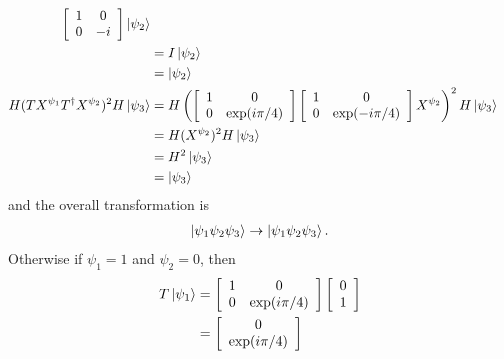 \documentclass[a4paper,12pt]{article}
\begin{document}
\begin{enumerate}
\begin{align*}
            \left[ \begin{array}{cc}
                1 & 0 \\
                0 & -i
            \end{array} \right] \ket{\psi_2} \\
            &= I \ket{\psi_2} \\
            &= \ket{\psi_2} \\
            H (T X^{\psi_1} T^\dagger X^{\psi_2})^2 H \ket{\psi_3} &= H \left(
            \left[ \begin{array}{cc}
                1 & 0 \\
                0 & \mbox{exp}(i \pi / 4)
            \end{array} \right]
            \left[ \begin{array}{cc}
                1 & 0 \\
                0 & \mbox{exp}(-i \pi / 4)
            \end{array} \right]
            X^{\psi_2} \right)^2 H \ket{\psi_3} \\
            &= H (X^{\psi_2})^2 H \ket{\psi_3} \\
            &= H^2 \ket{\psi_3} \\
            &= \ket{\psi_3} \\
        \end{align*}
        and the overall transformation is
        \begin{align*}
            \ket{\psi_1 \psi_2 \psi_3} \rightarrow \ket{\psi_1 \psi_2 \psi_3}.
        \end{align*}
        Otherwise if $\psi_1 = 1$ and $\psi_2 = 0$, then
        \begin{align*}
            T \ket{\psi_1} 
            &= \left[ \begin{array}{cc}
                1 & 0 \\
                0 & \mbox{exp}(i \pi / 4)
            \end{array} \right]
            \left[ \begin{array}{c}
                0 \\
                1
            \end{array} \right] \\
            &= \left[ \begin{array}{c}
                0 \\
                \mbox{exp}(i \pi / 4)
            \end{array} \right] \\

\end{align*}
\end{enumerate}
\end{document}
